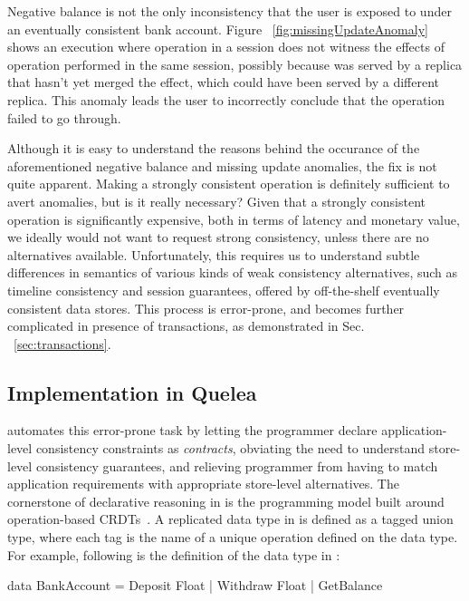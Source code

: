 Negative balance is not the only inconsistency that the user is
exposed to under an eventually consistent bank account. Figure
~\ref{fig:missingUpdateAnomaly} shows an execution where
 operation in a session does not witness the effects of
 operation performed in the same session, possibly
because  was served by a replica that hasn't yet merged
the  effect, which could have been served by a different
replica. This anomaly leads the user to incorrectly conclude that the
 operation failed to go through.

Although it is easy to understand the reasons behind the occurance of
the aforementioned negative balance and missing update anomalies, the
fix is not quite apparent. Making  a strongly
consistent operation is definitely sufficient to avert anomalies, but
is it really necessary? Given that a strongly consistent operation is
significantly expensive, both in terms of latency and monetary value, we ideally
would not want to request strong consistency, unless there are
no alternatives available. Unfortunately, this requires us to
understand subtle differences in semantics of various kinds of weak
consistency alternatives, such as timeline consistency and session
guarantees, offered by off-the-shelf eventually consistent data
stores. This process is error-prone, and becomes further complicated
in presence of transactions, as demonstrated in Sec.
~\ref{sec:transactions}.


\subsection{Implementation in Quelea}

\name automates this error-prone task by letting the programmer
declare application-level consistency constraints as \emph{contracts},
obviating the need to understand store-level consistency guarantees,
and relieving programmer from having to match application
requirements with appropriate store-level alternatives. The
cornerstone of declarative reasoning in \name is the programming model
built around operation-based CRDTs~\cite{shapiroCRDT}. A replicated
data type in \name is defined as a tagged union type, where each tag
is the name of a unique operation defined on the data type. 
For example, following is the definition of the 
data type in \name:
\begin{codehaskell}
data BankAccount =  Deposit Float | Withdraw Float 
                 | GetBalance
\end{codehaskell}

